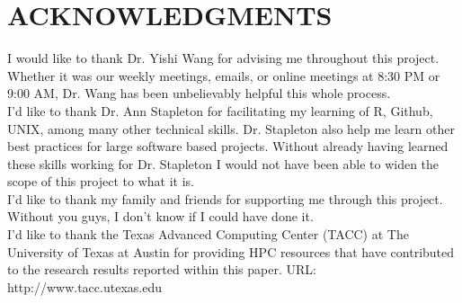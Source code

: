 \documentclass[12 pt]{uncw_thesis}
\theoremstyle{plain}
\theoremstyle{remark}
\theoremstyle{definition}
\begin{document}
\section*{ACKNOWLEDGMENTS}
I would like to thank Dr. Yishi Wang for advising me throughout this project. Whether it was our weekly meetings, emails, or online meetings at 8:30 PM or 9:00 AM, Dr. Wang has been unbelievably helpful this whole process. \\
\linebreak
I'd like to thank Dr. Ann  Stapleton for facilitating my learning of R,  Github, UNIX, among many other technical skills. Dr. Stapleton also help me learn other best practices for large software based projects. Without already having learned these skills working for Dr. Stapleton I would not have been able to widen the scope of this project to what it is.\\
\linebreak 
I'd like to thank my family and friends for supporting me through this project. Without you guys, I don't know if I could have done it.\\
\linebreak
I'd like to thank the Texas Advanced Computing Center (TACC) at The University of Texas at Austin for providing HPC resources that have contributed to the research results reported within this paper. URL: http://www.tacc.utexas.edu
%
\end{document}
